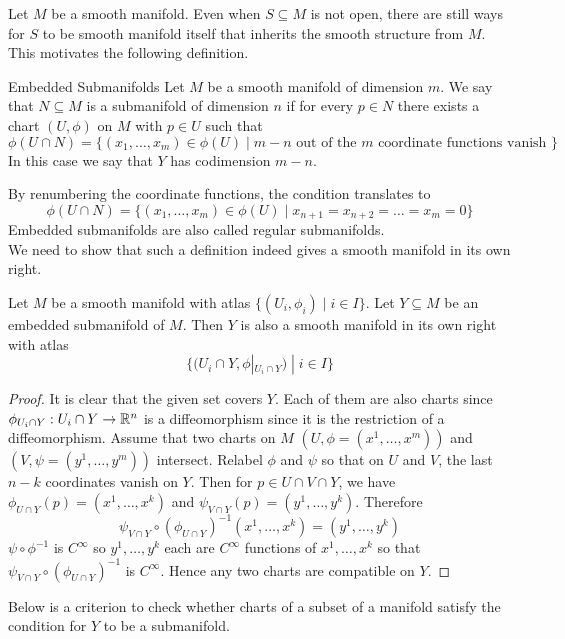 \documentclass[a4paper]{article}
\begin{document}
Let $M$ be a smooth manifold. Even when $S\subseteq M$ is not open, there are still ways for $S$ to be smooth manifold itself that inherits the smooth structure from $M$. This motivates the following definition. 

\begin{defn}{Embedded Submanifolds}{} Let $M$ be a smooth manifold of dimension $m$. We say that $N\subseteq M$ is a submanifold of dimension $n$ if for every $p\in N$ there exists a chart $(U,\phi)$ on $M$ with $p\in U$ such that $$\phi(U\cap N)=\{(x_1,\dots,x_m)\in\phi(U)\;|\;m-n\text{ out of the }m\text{ coordinate functions vanish }\}$$ In this case we say that $Y$ has codimension $m-n$. 
\end{defn}

By renumbering the coordinate functions, the condition translates to $$\phi(U\cap N)=\{(x_1,\dots,x_m)\in\phi(U)\;|\;x_{n+1}=x_{n+2}=\dots=x_m=0\}$$ Embedded submanifolds are also called regular submanifolds. \\

We need to show that such a definition indeed gives a smooth manifold in its own right. 

\begin{prp}{}{} Let $M$ be a smooth manifold with atlas $\{(U_i,\phi_i)\;|\;i\in I\}$. Let $Y\subseteq M$ be an embedded submanifold of $M$. Then $Y$ is also a smooth manifold in its own right with atlas $$\{(U_i\cap Y,\phi|_{U_i\cap Y})\;|\;i\in I\}$$\tcbline
\begin{proof}
It is clear that the given set covers $Y$. Each of them are also charts since $\phi_{U_i\cap Y}:U_i\cap Y\to\mathbb{R}^n$ is a diffeomorphism since it is the restriction of a diffeomorphism. Assume that two charts on $M$ $(U,\phi=(x^1,\dots,x^m))$ and $(V,\psi=(y^1,\dots,y^m))$ intersect. Relabel $\phi$ and $\psi$ so that on $U$ and $V$, the last $n-k$ coordinates vanish on $Y$. Then for $p\in U\cap V\cap Y$, we have $\phi_{U\cap Y}(p)=(x^1,\dots,x^k)$ and $\psi_{V\cap Y}(p)=(y^1,\dots,y^k)$. Therefore $$\psi_{V\cap Y}\circ(\phi_{U\cap Y})^{-1}(x^1,\dots,x^k)=(y^1,\dots,y^k)$$ $\psi\circ\phi^{-1}$ is $C^\infty$ so $y^1,\dots,y^k$ each are $C^\infty$ functions of $x^1,\dots,x^k$ so that $\psi_{V\cap Y}\circ(\phi_{U\cap Y})^{-1}$ is $C^\infty$. Hence any two charts are compatible on $Y$. 
\end{proof}
\end{prp}

Below is a criterion to check whether charts of a subset of a manifold satisfy the condition for $Y$ to be a submanifold. 
\end{document}
